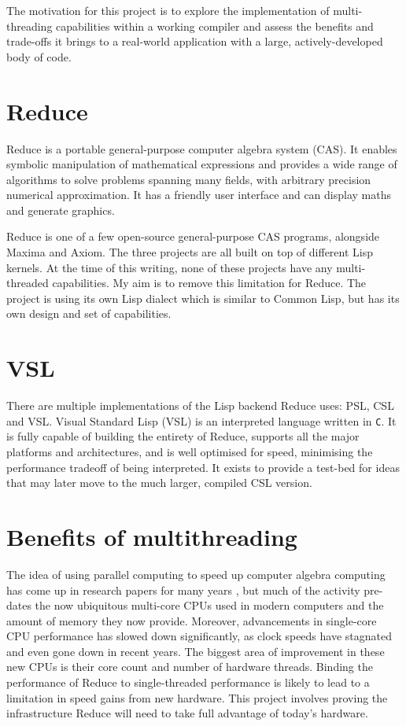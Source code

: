 The motivation for this project is to explore the implementation of multi-threading
capabilities within a working compiler and assess the benefits and trade-offs it brings
to a real-world application with a large, actively-developed body of code.

\section{Reduce}

Reduce \cite{reduce} is a portable general-purpose computer algebra system (CAS). It enables symbolic
manipulation of mathematical expressions and provides a wide range of algorithms
to solve problems spanning many fields, with arbitrary precision numerical approximation.
It has a friendly user interface and can display maths and generate graphics.

Reduce is one of a few open-source general-purpose CAS programs, alongside Maxima and Axiom.
The three projects are all built on top of different Lisp kernels. At the time of this writing,
none of these projects have any multi-threaded capabilities. My aim is to remove this limitation
for Reduce. The project is using its own Lisp dialect which is similar to Common Lisp, but has its
own design and set of capabilities.

\section{VSL}

There are multiple implementations of the Lisp backend Reduce uses: PSL, CSL and VSL.
Visual Standard Lisp (VSL) is an interpreted language written
in \texttt{C}. It is fully capable of building the entirety of Reduce, supports all the major
platforms and architectures, and is well optimised for speed, minimising the performance tradeoff
of being interpreted. It exists to provide a test-bed for ideas that may later move to the much larger,
compiled CSL version.

\section{Benefits of multithreading}
The idea of using parallel computing to speed up computer algebra computing has come
up in research papers for many years \cite{GabrielQML,multilisp,multilisp-implementation},
but much of the activity
pre-dates the now ubiquitous multi-core CPUs used in modern computers and the amount of memory
they now provide. Moreover, advancements in single-core CPU performance has slowed down
significantly, as clock speeds have stagnated and even gone down in recent years. The biggest
area of improvement in these new CPUs is their core count and number of hardware threads.
Binding the performance of Reduce to single-threaded performance is likely to lead to
a limitation in speed gains from new hardware. This project involves proving the infrastructure
Reduce will need to take full advantage of today's hardware.

